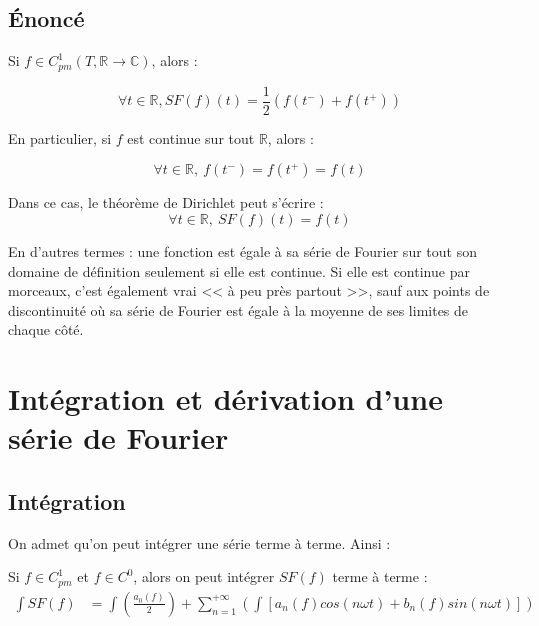 \documentclass[12pt, a4paper]{article}
\begin{document}
\subsection{Énoncé}

\begin{tcolorbox}
	Si $f \in C_{pm}^1(T,\mathbb{R} \to \mathbb{C})$, alors :
	
	\begin{equation*}
		\forall t \in \mathbb{R}, SF(f)(t) = \frac{1}{2}\left(f(t^-) + f(t^+)\right)
	\end{equation*}

	En particulier, si $f$ est continue sur tout $\mathbb{R}$, alors :
	
	\begin{equation*}
		\forall t \in \mathbb{R}, ~ f(t^-) = f(t^+) = f(t)
	\end{equation*}
	
	Dans ce cas, le théorème de Dirichlet peut s'écrire :
	\begin{equation*}
		\forall t \in \mathbb{R}, ~ SF(f)(t) = f(t)
	\end{equation*}
\end{tcolorbox}

En d'autres termes : une fonction est égale à sa série de Fourier sur tout son domaine de définition seulement si elle est continue. Si elle est continue par morceaux, c'est également vrai << à peu près partout >>, sauf aux points de discontinuité où sa série de Fourier est égale à la moyenne de ses limites de chaque côté.



\clearpage



\section{Intégration et dérivation d'une série de Fourier}

\subsection{Intégration}

On admet qu'on peut intégrer une série terme à terme. Ainsi :

\begin{tcolorbox}
	Si $f \in C_{pm}^1$ et $f \in C^0$, alors on peut intégrer $SF(f)$ terme à terme :
	\begin{equation*}
		\begin{aligned}
			\int SF(f) & = \int\left(\frac{a_0(f)}{2}\right) + \sum_{n = 1}^{+\infty}\left(\int\left[a_n(f)cos(n\omega t) + b_n(f)sin(n\omega t)\right]\right)
		\end{aligned}
	\end{equation*}
\end{tcolorbox}
\end{document}
